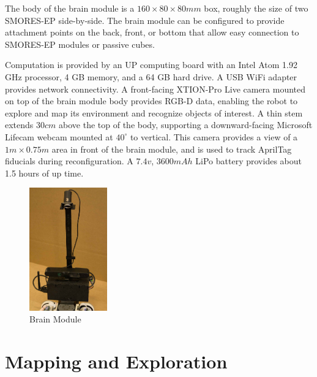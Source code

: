 \documentclass[conference]{IEEEtran}
\begin{document}
The body of the brain module is a $160\times80\times80mm$ box, roughly the size of two SMORES-EP side-by-side.  The brain module can be configured to provide attachment points on the back, front, or bottom that allow easy connection to SMORES-EP modules or passive cubes.

Computation is provided by an UP computing board with an Intel Atom 1.92 GHz processor, 4 GB memory, and a 64 GB hard drive. A USB WiFi adapter provides network connectivity. A front-facing XTION-Pro Live camera mounted on top of the brain module body provides RGB-D data, enabling the robot to explore and map its environment and recognize objects of interest.  A thin stem extends $30cm$ above the top of the body, supporting a downward-facing Microsoft Lifecam webcam mounted at $40^\circ$ to vertical.  This camera provides a view of a  $1m\times0.75m$ area in front of the brain module, and is used to track AprilTag \cite{olson2011apriltag} fiducials during reconfiguration. A $7.4v$, $3600mAh$ LiPo battery provides about 1.5 hours of up time.
%
\begin{figure}
\begin{center}
\includegraphics[width=0.3\textwidth]{images/sensor_module.jpg}
\caption{Brain Module}
\label{fig:sensor-module}
\end{center}
\end{figure}


\section{Mapping and Exploration}
\label{sec:exploration}
%
\end{document}
